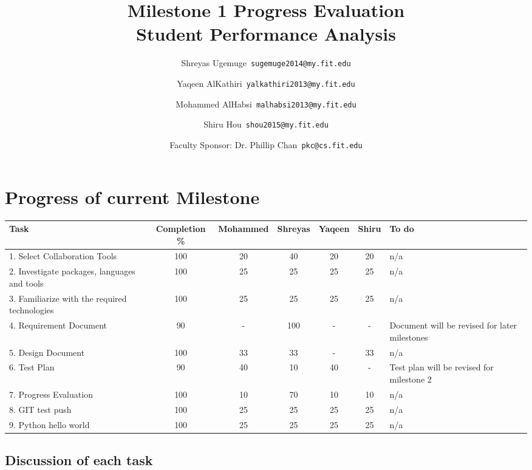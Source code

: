 \documentclass[12pt]{article}
\begin{document}
	\title{\textbf{Milestone 1 Progress Evaluation} \\ \hfill \break
	Student Performance Analysis}
	\author{Shreyas Ugemuge\      \texttt{sugemuge2014@my.fit.edu}
  \and
  Yaqeen AlKathiri\      \texttt{yalkathiri2013@my.fit.edu}
  \and
	Mohammed AlHabsi\      \texttt{malhabsi2013@my.fit.edu}
  \and
  Shiru Hou\      \texttt{shou2015@my.fit.edu}
  \and
  Faculty Sponsor: Dr. Phillip Chan\      \texttt{pkc@cs.fit.edu}}
	\maketitle
	\pagebreak
	\singlespacing
	\tableofcontents
	\pagebreak
	\section{Progress of current Milestone}
	\begin{tabularx}{\textwidth}{|X|c|c|c|c|c|X|}
	\hline
	\textbf{Task} & \textbf{Completion \%} & \textbf{Mohammed} & \textbf{Shreyas} & \textbf{Yaqeen} & \textbf{Shiru} & \textbf{To do} \\ \hline
	1. Select Collaboration Tools & 100 & 20 & 40 & 20 & 20 & n/a \\ \hline
	2. Investigate packages, languages and tools & 100 & 25 & 25 & 25 & 25 & n/a \\ \hline
	3. Familiarize with the required technologies & 100 & 25 & 25 & 25 & 25 & n/a \\ \hline
	4. Requirement Document & 90 & - & 100 & - & - & Document will be revised for later milestones \\ \hline
	5. Design Document & 100 & 33 & 33 & - & 33 & n/a \\ \hline
	6. Test Plan & 90 & 40 & 10 & 40 & - & Test plan will be revised for milestone 2 \\ \hline
	7. Progress Evaluation & 100 & 10 & 70 & 10 & 10 & n/a \\ \hline
	8. GIT test push & 100 & 25 & 25 & 25 & 25 & n/a \\ \hline
	9. Python hello world & 100 & 25 & 25 & 25 & 25 & n/a \\ \hline
	\end{tabularx}

	\subsection{Discussion of each task}
\end{document}
